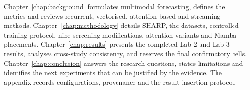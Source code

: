 Chapter~\ref{chap:background} formulates multimodal forecasting, defines the metrics and reviews recurrent, vectorised, attention-based and streaming methods. Chapter~\ref{chap:methodology} details SHARP, the datasets, controlled training protocol, nine screening modifications, attention variants and Mamba placements. Chapter~\ref{chap:results} presents the completed Lab 2 and Lab 3 results, analyses cross-study consistency, and reserves the final confirmatory cells. Chapter~\ref{chap:conclusion} answers the research questions, states limitations and identifies the next experiments that can be justified by the evidence. The appendix records configurations, provenance and the result-insertion protocol.
